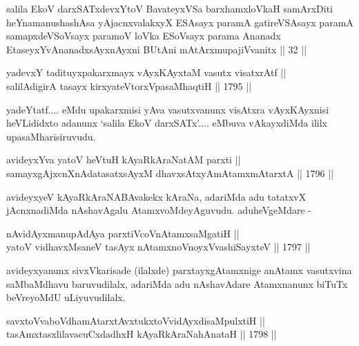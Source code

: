 \begin{shl}
salila EkoV darxSATxdevxYtoV BavateyxVSa barxhamxloVkaH samArxDiti heYnamanushashAsa yAjacnxvalakxyX ESAsayx paramA gatireVSAsayx paramA samapxdeVSoV\s sayx paramoV loVka ESoV\s sayx parama Ananadx EtaseyxYvAnanadxsAyxnAyxni BUtAni mAtArxmupajiVvanitx || 32 ||
\end{shl}

\begin{shl}
yadevxY tadituyxpakarxmayx vAyxKAyxtaM vasutx visatxrAtf || \\
salilAdigirA tasayx kirxyateV\s torxVpasaMhaqtiH \hfill || 1795 ||  
\end{shl}

\begin{artha}
yadeYtatf.... eMdu upakarxmisi yAva vasutxvanunx visAtxra vAyxKAyxnisi
heVLididxto adanunx `salila EkoV darxSATx'.... eMbuva vAkayxdiMda ililx
upasaMharisiruvudu.
\end{artha}

\begin{shl}
avideyxYva yatoV heVtuH kAyaRkAraNatAM parxti || \\
samayxgAjxcnXnAdatasatxsAyxM dhavxsAtxyAmAtamxmAtarxtA \hfill || 1796 ||  
\end{shl}

\begin{artha}
avideyxyeV kAyaRkAraNABAvakekx kAraNa, adariMda adu tatatxvX
jAcnxnadiMda nAshavAgalu AtamxvoMdeyAguvudu. aduheVgeMdare -
\end{artha}

\begin{shl}
nAvidAyxmanupAdAya parxtiVcoV\s nAtamxsaMgatiH || \\
yatoV vidhavxMsaneV tasAyx nA\s \s tamxnoV\s noyxV\s vashiSayxteV \hfill || 1797 ||  
\end{shl}	

\begin{artha}
avideyxyanunx sivxVkarisade (ilalxde) parxtayxgAtamxnige anAtamx
vasutxvina saMbaMdhavu baruvudilalx, adariMda adu nAshavAdare
Atamxnanunx biTuTx beVreyoMdU uLiyuvudilalx.
\end{artha}


\begin{shl}
savxtoV\s vaboVdhamAtarxtAvxtukxtoV\s vidAyxdisaMpulxtiH || \\
tasAmxtasxlilavacuCxdadhxH kAyaRkAraNahAnataH \hfill || 1798 ||  
\end{shl}

